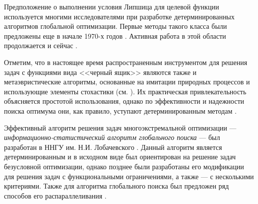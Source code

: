 \documentclass{cmi}
\begin{document}
Предположение о выполнении условия Липшица для целевой функции используется многими исследователями при разработке детерминированных алгоритмов глобальной оптимизации.
Первые методы такого класса были предложены еще в начале 1970-х годов . Активная работа в этой области продолжается и сейчас .


Отметим, что в настоящее время распространенным инструментом для решения задач с функциями вида <<черный ящик>> являются также и метаэвристические алгоритмы, основанные на имитации природных процессов и использующие элементы стохастики (см. ). Их практическая привлекательность объясняется простотой использования, однако по эффективности и надежности поиска оптимума они, как правило, уступают детерминированным методам .



Эффективный алгоритм решения задач многоэкстремальной оптимизации --- \textit{информационно-статистический алгоритм глобального поиска} --- был разработан в ННГУ им. Н.И. Лобачевского . 
Данный алгоритм является детерминированным и в исходном виде был ориентирован на решение задач безусловной оптимизации, однако позднее были разработаны его модификации для решения задач с функциональными ограничениями, а также --- с несколькими критериями. 
Также для алгоритма глобального поиска был предложен ряд способов его распараллеливания .
\end{document}
